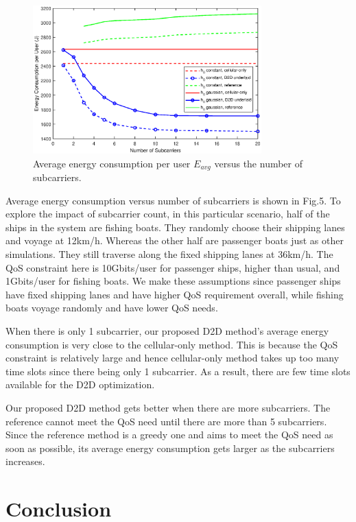 \documentclass{ieeeaccess}
\begin{document}
\begin{figure} [htb]
\includegraphics*[width=8.8cm]{Ns.eps}
\caption{Average energy consumption per user $E_{avg}$ versus the number of subcarriers.} \label{fig:5}
\end{figure}




Average energy consumption versus number of subcarriers is shown in Fig.5. To explore the impact of subcarrier count, in this particular scenario, half of the ships in the system are fishing boats. They randomly choose their shipping lanes and voyage at 12km/h. Whereas the other half are passenger boats just as other simulations. They still traverse along the fixed shipping lanes at 36km/h. The QoS constraint here is 10Gbits/user for passenger ships, higher than usual, and 1Gbits/user for fishing boats. We make these assumptions since passenger ships have fixed shipping lanes and have higher QoS requirement overall, while fishing boats voyage randomly and have lower QoS needs.

When there is only 1 subcarrier, our proposed D2D method's average energy consumption is very close to the cellular-only method. This is because the QoS constraint is relatively large and hence cellular-only method takes up too many time slots since there being only 1 subcarrier. As a result, there are few time slots available for the D2D optimization.

Our proposed D2D method gets better when there are more subcarriers. The reference cannot meet the QoS need until there are more than 5 subcarriers. Since the reference method is a greedy one and aims to meet the QoS need as soon as possible, its average energy consumption gets larger as the subcarriers increases.


\section{Conclusion}\label{sec:4}
\end{document}
